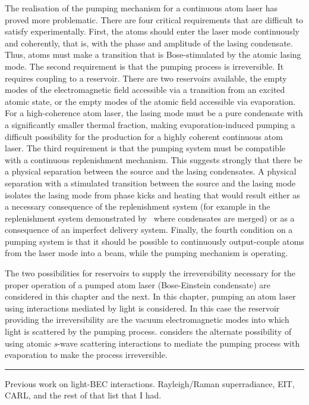 The realisation of the pumping mechanism for a continuous atom laser has proved more problematic. There are four critical requirements that are difficult to satisfy experimentally. First, the atoms should enter the laser mode continuously and coherently, that is, with the phase and amplitude of the lasing condensate. Thus, atoms must make a transition that is Bose-stimulated by the atomic lasing mode. The second requirement is that the pumping process is irreversible. It requires coupling to a reservoir. There are two reservoirs available, the empty modes of the electromagnetic field accessible via a transition from an excited atomic state, or the empty modes of the atomic field accessible via evaporation. For a high-coherence atom laser, the lasing mode must be a pure condensate with a significantly smaller thermal fraction, making evaporation-induced pumping a difficult possibility for the production for a highly coherent continuous atom laser. The third requirement is that the pumping system must be compatible with a continuous replenishment mechanism. This suggests strongly that there be a physical separation between the source and the lasing condensates. A physical separation with a stimulated transition between the source and the lasing mode isolates the lasing mode from phase kicks and heating that would result either as a necessary consequence of the replenishment system (for example in the replenishment system demonstrated by~\citet{Chikkatur:2002qa} where condensates are merged) or as a consequence of an imperfect delivery system. Finally, the fourth condition on a pumping system is that it should be possible to continuously output-couple atoms from the laser mode into a beam, while the pumping mechanism is operating.

The two possibilities for reservoirs to supply the irreversibility necessary for the proper operation of a pumped atom laser (Bose-Einstein condensate) are considered in this chapter and the next. In this chapter, pumping an atom laser using interactions mediated by light is considered. In this case the reservoir providing the irreversibility are the vacuum electromagnetic modes into which light is scattered by the pumping process.  considers the alternate possibility of using atomic \emph{s}-wave scattering interactions to mediate the pumping process with evaporation to make the process irreversible.

\hrule

Previous work on light-BEC interactions. Rayleigh/Raman superradiance, EIT, CARL, and the rest of that list that I had.


